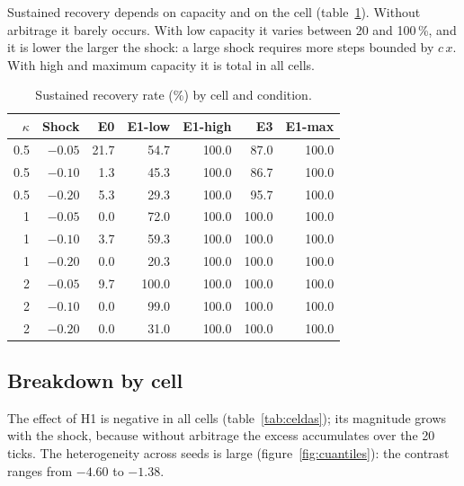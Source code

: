 Sustained recovery depends on capacity and on the cell (table~\ref{tab:recuperacion}). Without arbitrage it barely occurs. With low capacity it varies between 20 and 100\,\%, and it is lower the larger the shock: a large shock requires more steps bounded by $c\,x$. With high and maximum capacity it is total in all cells.

\begin{table}[htbp]
\centering
\caption{Sustained recovery rate (\%) by cell and condition.}
\label{tab:recuperacion}
\small
\begin{tabular}{@{}rrrrrrr@{}}
\toprule
$\kappa$ & Shock & E0 & E1-low & E1-high & E3 & E1-max \\
\midrule
0.5 & $-0.05$ & 21.7 & 54.7 & 100.0 & 87.0 & 100.0 \\
0.5 & $-0.10$ & 1.3 & 45.3 & 100.0 & 86.7 & 100.0 \\
0.5 & $-0.20$ & 5.3 & 29.3 & 100.0 & 95.7 & 100.0 \\
1 & $-0.05$ & 0.0 & 72.0 & 100.0 & 100.0 & 100.0 \\
1 & $-0.10$ & 3.7 & 59.3 & 100.0 & 100.0 & 100.0 \\
1 & $-0.20$ & 0.0 & 20.3 & 100.0 & 100.0 & 100.0 \\
2 & $-0.05$ & 9.7 & 100.0 & 100.0 & 100.0 & 100.0 \\
2 & $-0.10$ & 0.0 & 99.0 & 100.0 & 100.0 & 100.0 \\
2 & $-0.20$ & 0.0 & 31.0 & 100.0 & 100.0 & 100.0 \\
\bottomrule
\end{tabular}
\end{table}

\subsection{Breakdown by cell}

The effect of H1 is negative in all cells (table~\ref{tab:celdas}); its magnitude grows with the shock, because without arbitrage the excess accumulates over the 20 ticks. The heterogeneity across seeds is large (figure~\ref{fig:cuantiles}): the contrast ranges from $-4.60$ to $-1.38$.

